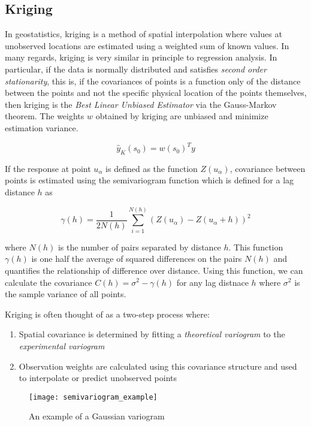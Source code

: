 \documentclass{article}
\begin{document}
\subsection{Kriging}
In geostatistics, kriging is a method of spatial interpolation where values at unobserved locations are estimated using a weighted sum of known values.
In many regards, kriging is very similar in principle to regression analysis.
In particular, if the data is normally distributed and satisfies \textit{second order stationarity}, this is, if the covariances of points is a function only of the distance between the points and not the specific physical location of the points themselves, then kriging is the \textit{Best Linear Unbiased Estimator} via the Gauss-Markov theorem.
The weights $w$ obtained by kriging are unbiased and minimize estimation variance.

$$
\hat{y}_{K}(s_0) = w(s_0)^T y
$$

If the response at point $u_\alpha$ is defined as the function $Z(u_\alpha)$, covariance between points is estimated using the semivariogram function which is defined for a lag distance $h$ as

$$
\gamma(h) = \frac{1}{2 N(h)} \sum_{i=1}^{N(h)} (Z(u_{\alpha}) - Z(u_{\alpha} + h))^2
$$

where $N(h)$ is the number of pairs separated by distance $h$.
This function $\gamma(h)$ is one half the average of squared differences on the pairs $N(h)$ and quantifies the relationship of difference over distance.
Using this function, we can calculate the covariance $C(h) = \sigma^2 - \gamma(h)$ for any lag distnace $h$ where $\sigma^2$ is the sample variance of all points.

Kriging is often thought of as a two-step process where:

\begin{enumerate}
	\item Spatial covariance is determined by fitting a \textit{theoretical variogram} to the \textit{experimental variogram}
	\item Observation weights are calculated using this covariance structure and used to interpolate or predict unobserved points
\end{enumerate}

\begin{figure}
	\begin{centering}
\texttt{[image: semivariogram\_example]}
\caption{An example of a Gaussian variogram\label{fig:semivariogram_example}}
\end{centering}
\end{figure}
\end{document}
